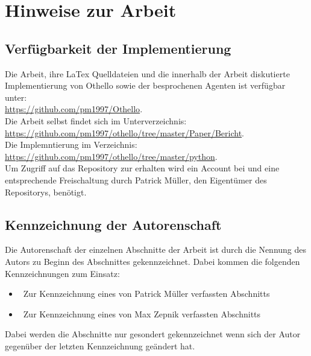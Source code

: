\chapter*{Hinweise zur Arbeit}
\section*{Verfügbarkeit der Implementierung}
Die Arbeit, ihre LaTex Quelldateien und die innerhalb der Arbeit diskutierte Implementierung von Othello sowie der besprochenen Agenten ist verfügbar unter: 
\\\href{https://github.com/pm1997/Othello}{https://github.com/pm1997/Othello}.
\\Die Arbeit selbst findet sich im Unterverzeichnis:
\\\href{https://github.com/pm1997/othello/tree/master/Paper/Bericht}{https://github.com/pm1997/othello/tree/master/Paper/Bericht}.
\\Die Implemntierung im Verzeichnis:
\\\href{https://github.com/pm1997/othello/tree/master/python}{https://github.com/pm1997/othello/tree/master/python}.
\\Um Zugriff auf das Repository zur erhalten wird ein Account bei  und eine entsprechende Freischaltung durch Patrick Müller, den Eigentümer des Repositorys, benötigt.

\section*{Kennzeichnung der Autorenschaft}
Die Autorenschaft der einzelnen Abschnitte der Arbeit ist durch die Nennung des Autors zu Beginn des Abschnittes gekennzeichnet. Dabei kommen die folgenden Kennzeichnungen zum Einsatz:
\begin{itemize}
\item \authorpatrick\ Zur Kennzeichnung eines von Patrick Müller verfassten Abschnitts
\item \authormax\ Zur Kennzeichnung eines von Max Zepnik verfassten Abschnitts
\end{itemize}
Dabei werden die Abschnitte nur gesondert gekennzeichnet wenn sich der Autor gegenüber der letzten Kennzeichnung geändert hat.  